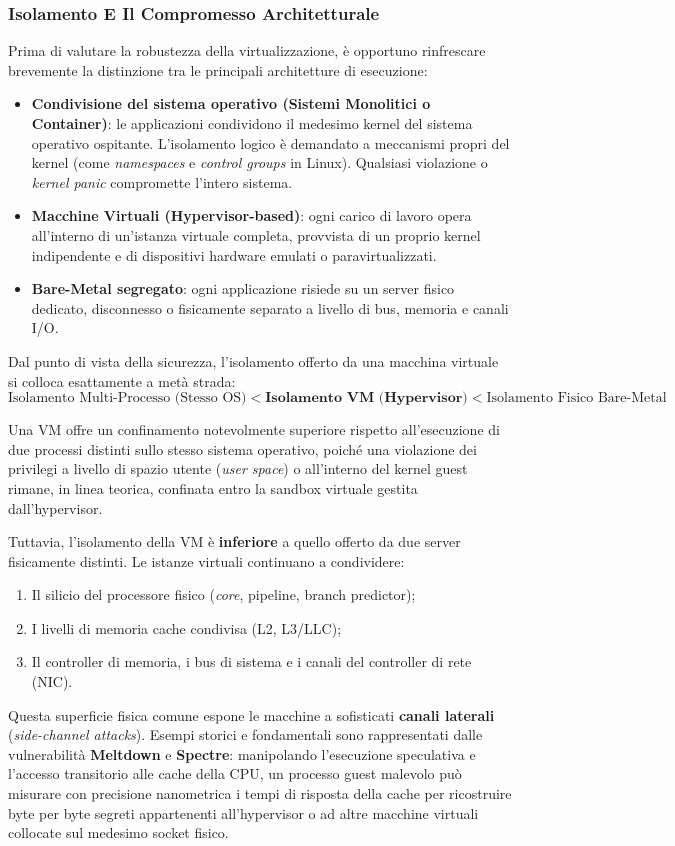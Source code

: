 \documentclass[11pt, a4paper]{article}
\begin{document}
\subsubsection{Isolamento E Il Compromesso Architetturale}
Prima di valutare la robustezza della virtualizzazione, è opportuno rinfrescare brevemente la distinzione tra le principali architetture di esecuzione:
\begin{itemize}
    \item \textbf{Condivisione del sistema operativo (Sistemi Monolitici o Container)}: le applicazioni condividono il medesimo kernel del sistema operativo ospitante. L'isolamento logico è demandato a meccanismi propri del kernel (come \emph{namespaces} e \emph{control groups} in Linux). Qualsiasi violazione o \emph{kernel panic} compromette l'intero sistema.
    \item \textbf{Macchine Virtuali (Hypervisor-based)}: ogni carico di lavoro opera all'interno di un'istanza virtuale completa, provvista di un proprio kernel indipendente e di dispositivi hardware emulati o paravirtualizzati.
    \item \textbf{Bare-Metal segregato}: ogni applicazione risiede su un server fisico dedicato, disconnesso o fisicamente separato a livello di bus, memoria e canali I/O.
\end{itemize}

Dal punto di vista della sicurezza, l'isolamento offerto da una macchina virtuale si colloca esattamente a metà strada:
\begin{equation*}
    \text{Isolamento Multi-Processo (Stesso OS)} < \mathbf{\text{Isolamento VM (Hypervisor)}} < \text{Isolamento Fisico Bare-Metal}
\end{equation*}

Una VM offre un confinamento notevolmente superiore rispetto all'esecuzione di due processi distinti sullo stesso sistema operativo, poiché una violazione dei privilegi a livello di spazio utente (\emph{user space}) o all'interno del kernel guest rimane, in linea teorica, confinata entro la sandbox virtuale gestita dall'hypervisor.

Tuttavia, l'isolamento della VM è \textbf{inferiore} a quello offerto da due server fisicamente distinti. Le istanze virtuali continuano a condividere:
\begin{enumerate}
    \item Il silicio del processore fisico (\emph{core}, pipeline, branch predictor);
    \item I livelli di memoria cache condivisa (L2, L3/LLC);
    \item Il controller di memoria, i bus di sistema e i canali del controller di rete (NIC).
\end{enumerate}
Questa superficie fisica comune espone le macchine a sofisticati \textbf{canali laterali} (\emph{side-channel attacks}). Esempi storici e fondamentali sono rappresentati dalle vulnerabilità \textbf{Meltdown} e \textbf{Spectre}: manipolando l'esecuzione speculativa e l'accesso transitorio alle cache della CPU, un processo guest malevolo può misurare con precisione nanometrica i tempi di risposta della cache per ricostruire byte per byte segreti appartenenti all'hypervisor o ad altre macchine virtuali collocate sul medesimo socket fisico.
\end{document}
